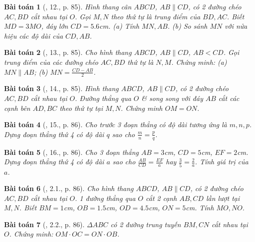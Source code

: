 \documentclass{article}
\newtheorem{baitoan}{Bài toán}
\begin{document}
\begin{baitoan}[\cite{SBT_Toan_8_tap_2}, 12., p. 85]
	Hình thang cân $ABCD$, $AB\parallel CD$, có 2 đường chéo $AC,BD$ cắt nhau tại $O$. Gọi $M,N$ theo thứ tự là trung điểm của $BD,AC$. Biết $MD = 3MO$, đáy lớn $CD = 5.6$\emph{cm}. (a) Tính $MN,AB$. (b) So sánh $MN$ với nửa hiệu các độ dài của $CD,AB$.
\end{baitoan}

\begin{baitoan}[\cite{SBT_Toan_8_tap_2}, 13., p. 85]
	Cho hình thang $ABCD$, $AB\parallel CD$, $AB < CD$. Gọi trung điểm của các đường chéo $AC,BD$ thứ tự là $N,M$. Chứng minh: (a) $MN\parallel AB$; (b) $MN = \frac{CD - AB}{2}$.
\end{baitoan}

\begin{baitoan}[\cite{SBT_Toan_8_tap_2}, 14., p. 85]
	Hình thang $ABCD$, $AB\parallel CD$, có 2 đường chéo $AC,BD$ cắt nhau tại $O$. Đường thẳng qua $O$ \& song song với đáy $AB$ cắt các cạnh bên $AD,BC$ theo thứ tự tại $M,N$. Chứng minh $OM = ON$.
\end{baitoan}

\begin{baitoan}[\cite{SBT_Toan_8_tap_2}, 15., p. 86]
	Cho trước 3 đoạn thẳng có độ dài tương ứng là $m,n,p$. Dựng đoạn thẳng thứ 4 có độ dài $q$ sao cho $\frac{m}{n} = \frac{p}{q}$.
\end{baitoan}

\begin{baitoan}[\cite{SBT_Toan_8_tap_2}, 16., p. 86]
	Cho 3 đoạn thẳng $AB = 3$\emph{cm}, $CD = 5$\emph{cm}, $EF = 2$\emph{cm}. Dựng đoạn thẳng thứ 4 có độ dài $a$ sao cho $\frac{AB}{CD} = \frac{EF}{a}$ hay $\frac{3}{5} = \frac{2}{a}$. Tính giá trị của $a$.
\end{baitoan}

\begin{baitoan}[\cite{SBT_Toan_8_tap_2}, 2.1., p. 86]
	Cho hình thang $ABCD$, $AB\parallel CD$, có 2 đường chéo $AC,BD$ cắt nhau tại $O$. 1 đường thẳng qua $O$ cắt 2 cạnh $AB,CD$ lần lượt tại $M,N$. Biết $BM = 1$\emph{cm}, $OB = 1.5$\emph{cm}, $OD = 4.5$\emph{cm}, $ON = 5$\emph{cm}. Tính $MO,NO$.
\end{baitoan}

\begin{baitoan}[\cite{SBT_Toan_8_tap_2}, 2.2., p. 86]
	$\Delta ABC$ có 2 đường trung tuyến $BM,CN$ cắt nhau tại $O$. Chứng minh: $OM\cdot OC = ON\cdot OB$.
\end{baitoan}
\end{document}
